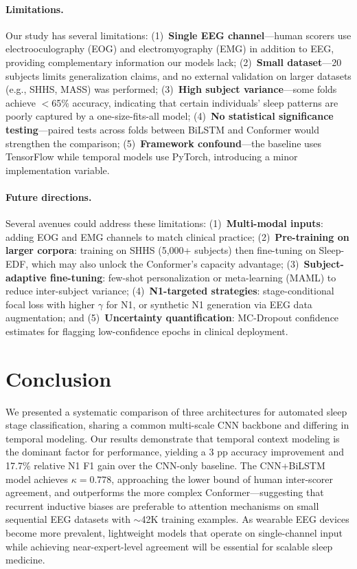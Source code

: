 \documentclass[final]{article}
\begin{document}
\paragraph{Limitations.}
Our study has several limitations: (1)~\textbf{Single EEG channel}---human scorers use electrooculography (EOG) and electromyography (EMG) in addition to EEG, providing complementary information our models lack; (2)~\textbf{Small dataset}---20 subjects limits generalization claims, and no external validation on larger datasets (e.g., SHHS, MASS) was performed; (3)~\textbf{High subject variance}---some folds achieve $<$65\% accuracy, indicating that certain individuals' sleep patterns are poorly captured by a one-size-fits-all model; (4)~\textbf{No statistical significance testing}---paired tests across folds between BiLSTM and Conformer would strengthen the comparison; (5)~\textbf{Framework confound}---the baseline uses TensorFlow while temporal models use PyTorch, introducing a minor implementation variable.

\paragraph{Future directions.}
Several avenues could address these limitations: (1)~\textbf{Multi-modal inputs}: adding EOG and EMG channels to match clinical practice; (2)~\textbf{Pre-training on larger corpora}: training on SHHS (5,000+ subjects) then fine-tuning on Sleep-EDF, which may also unlock the Conformer's capacity advantage; (3)~\textbf{Subject-adaptive fine-tuning}: few-shot personalization or meta-learning (MAML) to reduce inter-subject variance; (4)~\textbf{N1-targeted strategies}: stage-conditional focal loss with higher $\gamma$ for N1, or synthetic N1 generation via EEG data augmentation; and (5)~\textbf{Uncertainty quantification}: MC-Dropout confidence estimates for flagging low-confidence epochs in clinical deployment.

\section{Conclusion}

We presented a systematic comparison of three architectures for automated sleep stage classification, sharing a common multi-scale CNN backbone and differing in temporal modeling. Our results demonstrate that temporal context modeling is the dominant factor for performance, yielding a 3 pp accuracy improvement and 17.7\% relative N1 F1 gain over the CNN-only baseline. The CNN+BiLSTM model achieves $\kappa = 0.778$, approaching the lower bound of human inter-scorer agreement, and outperforms the more complex Conformer---suggesting that recurrent inductive biases are preferable to attention mechanisms on small sequential EEG datasets with $\sim$42K training examples. As wearable EEG devices become more prevalent, lightweight models that operate on single-channel input while achieving near-expert-level agreement will be essential for scalable sleep medicine.



\end{document}
